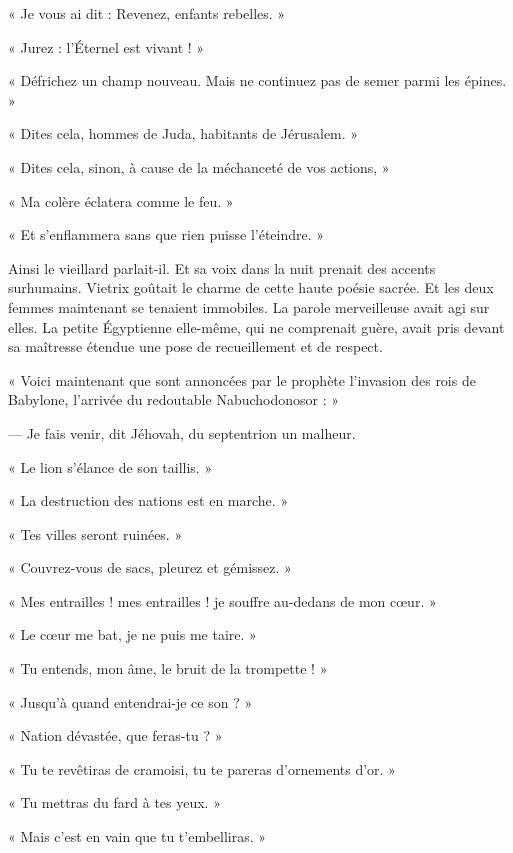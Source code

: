 \documentclass[a4paper, 11pt, oneside, polutonikogreek, french]{article}
\begin{document}
« Je vous ai dit : Revenez, enfants rebelles. »

« Jurez : l'Éternel est vivant ! »

« Défrichez un champ nouveau. Mais ne continuez pas de semer parmi les épines. »

« Dites cela, hommes de Juda, habitants de Jérusalem. »

« Dites cela, sinon, à cause de la méchanceté de vos actions, »

« Ma colère éclatera comme le feu. »

« Et s'enflammera sans que rien puisse l'éteindre. »

\bigskip
\centerline{\EightStarTaper}
\centerline{\EightStarTaper\EightStarTaper}
\bigskip

Ainsi le vieillard parlait-il. Et sa voix dans la nuit prenait des accents surhumains. Vietrix goûtait le charme de cette haute poésie sacrée. Et les deux femmes maintenant se tenaient immobiles. La parole merveilleuse avait agi sur elles. La petite Égyptienne elle-même, qui ne comprenait guère, avait pris devant sa maîtresse étendue une pose de recueillement et de respect.

\bigskip
\centerline{\EightStarTaper}
\centerline{\EightStarTaper\EightStarTaper}
\bigskip

« Voici maintenant que sont annoncées par le prophète l'invasion des rois de Babylone, l'arrivée du redoutable Nabuchodonosor : »

--- Je fais venir, dit Jéhovah, du septentrion un malheur.

« Le lion s'élance de son taillis. »

« La destruction des nations est en marche. »

« Tes villes seront ruinées. »

« Couvrez-vous de sacs, pleurez et gémissez. »

« Mes entrailles ! mes entrailles ! je souffre au-dedans de mon cœur. »

« Le cœur me bat, je ne puis me taire. »

« Tu entends, mon âme, le bruit de la trompette ! »

« Jusqu'à quand entendrai-je ce son ? »

« Nation dévastée, que feras-tu ? »

« Tu te revêtiras de cramoisi, tu te pareras d'ornements d'or. »

« Tu mettras du fard à tes yeux. »

« Mais c'est en vain que tu t'embelliras. »
\end{document}
